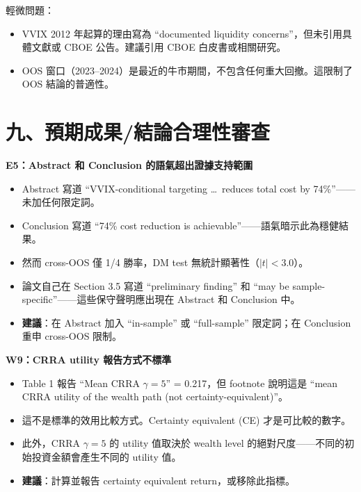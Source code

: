 \documentclass[12pt,a4paper]{article}
\begin{document}
輕微問題：

\begin{itemize}[leftmargin=2em]
\item VVIX 2012 年起算的理由寫為 ``documented liquidity concerns''，但未引用具體文獻或 CBOE 公告。建議引用 CBOE 白皮書或相關研究。
\item OOS 窗口（2023--2024）是最近的牛市期間，不包含任何重大回撤。這限制了 OOS 結論的普適性。
\end{itemize}

\section*{九、預期成果/結論合理性審查}

\textcolor{errorred}{\textbf{E5：Abstract 和 Conclusion 的語氣超出證據支持範圍}}

\begin{itemize}[leftmargin=2em]
\item Abstract 寫道 ``VVIX-conditional targeting \ldots\ reduces total cost by 74\%''——未加任何限定詞。
\item Conclusion 寫道 ``74\% cost reduction is achievable''——語氣暗示此為穩健結果。
\item 然而 cross-OOS 僅 1/4 勝率，DM test 無統計顯著性（$|t| < 3.0$）。
\item 論文自己在 Section 3.5 寫道 ``preliminary finding'' 和 ``may be sample-specific''——這些保守聲明應出現在 Abstract 和 Conclusion 中。
\item \textbf{建議}：在 Abstract 加入 ``in-sample'' 或 ``full-sample'' 限定詞；在 Conclusion 重申 cross-OOS 限制。
\end{itemize}

\textcolor{warncolor}{\textbf{W9：CRRA utility 報告方式不標準}}

\begin{itemize}[leftmargin=2em]
\item Table 1 報告 ``Mean CRRA $\gamma = 5$'' = 0.217，但 footnote 說明這是 ``mean CRRA utility of the wealth path (not certainty-equivalent)''。
\item 這不是標準的效用比較方式。Certainty equivalent (CE) 才是可比較的數字。
\item 此外，CRRA $\gamma = 5$ 的 utility 值取決於 wealth level 的絕對尺度——不同的初始投資金額會產生不同的 utility 值。
\item \textbf{建議}：計算並報告 certainty equivalent return，或移除此指標。
\end{itemize}
\end{document}
